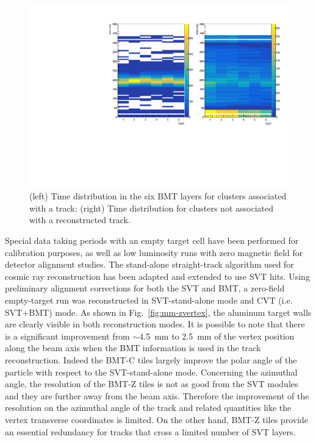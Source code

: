 \begin{figure}[htb]
 \includegraphics[width=\columnwidth,keepaspectratio]{images/align_cls_time.pdf}
 \caption{(left) Time distribution in the six BMT layers for clusters associated with a track; (right) Time distribution for clusters
   not associated with a reconstructed track.}
 \label{fig:mm-beam_cls_time}
\end{figure}

Special data taking periods with an empty target cell have been performed for calibration purposes, as well as low luminosity runs
with zero magnetic field for detector alignment studies. The stand-alone straight-track algorithm used for cosmic ray
reconstruction has been adapted and extended to use SVT hits. Using preliminary alignment corrections for both the SVT and
BMT, a zero-field empty-target run was reconstructed in SVT-stand-alone mode and CVT (i.e. SVT$+$BMT) mode. As shown in
Fig.~\ref{fig:mm-zvertex}, the aluminum target walls are clearly visible in both reconstruction modes. It is possible to note that
there is a significant improvement from $\sim$4.5~mm to 2.5~mm of the vertex position along the beam axis when the BMT
information is used in the track reconstruction. Indeed the BMT-C tiles largely improve the polar angle of the particle with
respect to the SVT-stand-alone mode. Concerning the azimuthal angle, the resolution of the BMT-Z tiles is not as good from the
SVT modules and they are further away from the beam axis. Therefore the improvement of the resolution on the azimuthal angle
of the track and related quantities like the vertex transverse coordinates is limited. On the other hand, BMT-Z tiles provide an
essential redundancy for tracks that cross a limited number of SVT layers.

